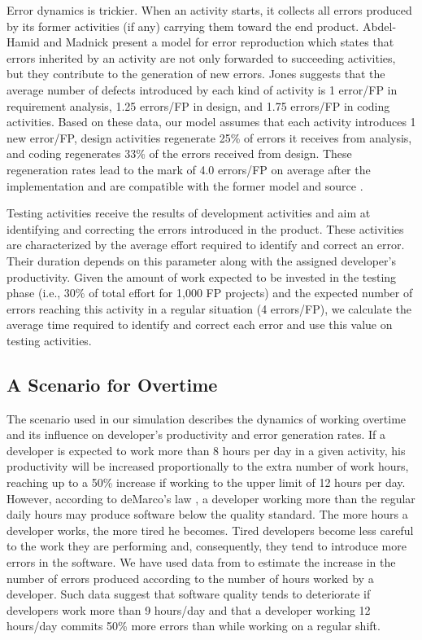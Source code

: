 \documentclass[conference]{IEEEtran}
\begin{document}
Error dynamics is trickier. When an activity starts, it collects all errors produced by its former activities (if any) carrying them toward the end product. Abdel-Hamid and Madnick \cite{Abdel-Hamid:1991} present a model for error reproduction which states that errors inherited by an activity are not only forwarded to succeeding activities, but they contribute to the generation of new errors. Jones \cite{Jones:2000} suggests that the average number of defects introduced by each kind of activity is 1 error/FP in requirement analysis, 1.25 errors/FP in design, and 1.75 errors/FP in coding activities. Based on these data, our model assumes that each activity introduces 1 new error/FP, design activities regenerate 25\% of errors it receives from analysis, and coding regenerates 33\% of the errors received from design. These regeneration rates lead to the mark of 4.0 errors/FP on average after the implementation and are compatible with the former model \cite{Abdel-Hamid:1991} and source \cite{Jones:2000}.

Testing activities receive the results of development activities and aim at identifying and correcting the errors introduced in the product. These activities are characterized by the average effort required to identify and correct an error. Their duration depends on this parameter along with the assigned developer’s productivity. Given the amount of work expected to be invested in the testing phase \cite{Jones:2000} (i.e., 30\% of total effort for 1,000 FP projects) and the expected number of errors reaching this activity in a regular situation (4 errors/FP), we calculate the average time required to identify and correct each error and use this value on testing activities.

\subsection{A Scenario for Overtime}

The scenario used in our simulation describes the dynamics of working overtime and its influence on developer's productivity and error generation rates. If a developer is expected to work more than 8 hours per day in a given activity, his productivity will be increased proportionally to the extra number of work hours, reaching up to a 50\% increase if working to the upper limit of 12 hours per day. However, according to deMarco's law \cite{demarco:1999}, a developer working more than the regular daily hours may produce software below the quality standard. The more hours a developer works, the more tired he becomes. Tired developers become less careful to the work they are performing and, consequently, they tend to introduce more errors in the software. We have used data from \cite{Abdel-Hamid:1991}  to estimate the increase in the number of errors produced according to the number of hours worked by a developer. Such data suggest that software quality tends to deteriorate if developers work more than 9 hours/day and that a developer working 12 hours/day commits 50\% more errors than while working on a regular shift.
\end{document}
